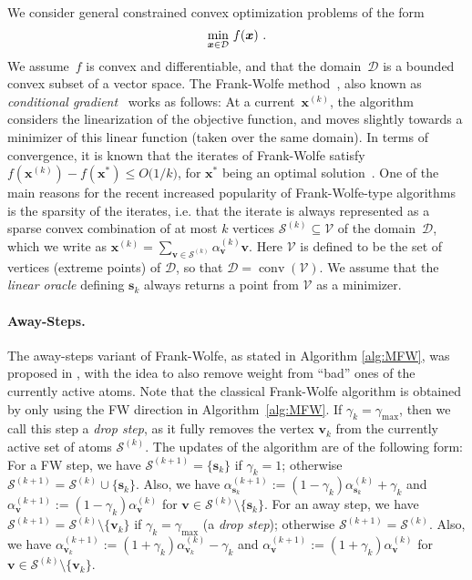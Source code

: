 \documentclass{article} %
\DeclareMathOperator*{\conv}{conv}
\newcommand{\domain}{\mathcal{D}}
\newcommand{\stepsize}{\gamma}
\newcommand{\stepmax}{\stepsize_{\textrm{max}}} %
\newcommand{\x}{\bm{x}}
\newcommand{\s}{\bm{s}}
\newcommand{\vv}{\bm{v}} %
\newcommand{\Vertices}{\mathcal{V}}
\newcommand{\Coreset}{\mathcal{S}}
\newcommand{\0}{\mathbf{0}} %
\begin{document}
%
We consider general constrained convex optimization problems of the form\vspace{-1mm}
\begin{equation*}\label{eq:optGenConvex}
   \min_{\x \in \domain} \, f(\x) \ .\vspace{-1mm}
\end{equation*}
We assume~$f$ is convex and differentiable, and that the domain~$\domain$ %
is a bounded convex subset of a vector space.
%
The Frank-Wolfe method~\cite{Frank:1956vp}, also known as \emph{conditional gradient}~\cite{Levitin:1966gf} works as follows:
%
%
%
%
%
%
%
%
%
At a current~$\x^{(k)}$, the algorithm considers the linearization of the objective function, and moves slightly towards a minimizer of this linear function (taken over the same domain).
In terms of convergence, it is known that the iterates of Frank-Wolfe satisfy $f(\x^{(k)}) - f(\x^*) \le O\big(1/k\big)$, for $\x^*$ being an optimal solution~\cite{Frank:1956vp,Dunn:1978di,Jaggi:2013wg}. %
%
One of the main reasons for the recent increased popularity of Frank-Wolfe-type algorithms is the sparsity of the iterates, i.e. that the iterate is always represented as a sparse convex combination of at most $k$ vertices $\Coreset^{(k)}\subseteq \Vertices$ of the domain~$\domain$, which we write as $\x^{(k)}= \sum_{\vv \in \Coreset^{(k)}} \alpha^{(k)}_{\vv} \vv$.
Here $\Vertices$ is defined to be the set of vertices (extreme points) of $\domain$, so that $\domain = \conv(\Vertices)$.
We assume that the \emph{linear oracle} defining $\s_k$ always returns a point from $\Vertices$ as a minimizer.

%
%

\vspace{-4mm}
\paragraph{Away-Steps.}
The away-steps variant of Frank-Wolfe, as stated in Algorithm \ref{alg:MFW}, was proposed in \cite{Wolfe:1970wy}, with the idea to also remove weight from ``bad'' ones of the currently active atoms. %
Note that the classical Frank-Wolfe algorithm is obtained by only using the FW direction in Algorithm~\ref{alg:MFW}.
If $\stepsize_k = \stepmax$, then we call this step a \emph{drop step}, as it fully removes the vertex $\vv_k$ from the currently active set of atoms  $\Coreset^{(k)}$.
%
The updates of the algorithm are of the following form:
For a FW step, we have $\Coreset^{(k+1)} = \{\s_k\}$ if $\stepsize_k = 1$; otherwise $\Coreset^{(k+1)} = \Coreset^{(k)} \cup \{\s_k\}$. Also, we have $\alpha^{(k+1)}_{\s_k} := (1-\stepsize_k) \alpha^{(k)}_{\s_k} + \stepsize_k$ and $\alpha^{(k+1)}_{\vv} := (1-\stepsize_k) \alpha^{(k)}_{\vv}$ for $\vv \in \Coreset^{(k)} \setminus  \{\s_k\}$. 
For an away step, we have $\Coreset^{(k+1)} = \Coreset^{(k)} \setminus \{\vv_k\}$ if  $\stepsize_k = \stepmax$ (a \emph{drop step}); 
otherwise $\Coreset^{(k+1)} = \Coreset^{(k)}$.  Also, we have $\alpha^{(k+1)}_{\vv_k} := (1+\stepsize_k) \alpha^{(k)}_{\vv_k} - \stepsize_k$ and $\alpha^{(k+1)}_{\vv} := (1+\stepsize_k) \alpha^{(k)}_{\vv}$ for $\vv \in \Coreset^{(k)} \setminus  \{\vv_k\}$. 
\end{document}
